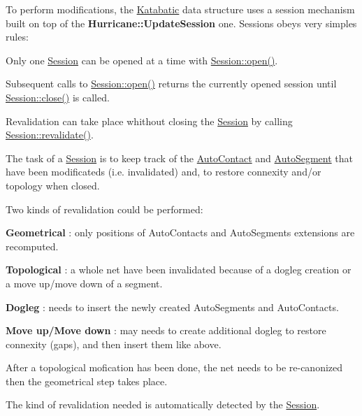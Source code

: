 To perform modifications, the \hyperlink{namespaceKatabatic}{Katabatic} data structure uses a session mechanism built on top of the {\bf Hurricane\-::\-Update\-Session} one. Sessions obeys very simples rules\-:
\begin{DoxyItemize}
\item Only one \hyperlink{classKatabatic_1_1Session}{Session} can be opened at a time with \hyperlink{classKatabatic_1_1Session_a000e098850f6cccff6b289a294149a41}{Session\-::open()}.
\item Subsequent calls to \hyperlink{classKatabatic_1_1Session_a000e098850f6cccff6b289a294149a41}{Session\-::open()} returns the currently opened session until \hyperlink{classKatabatic_1_1Session_a5ae591df94fc66ccb85cbb6565368bca}{Session\-::close()} is called.
\item Revalidation can take place whithout closing the \hyperlink{classKatabatic_1_1Session}{Session} by calling \hyperlink{classKatabatic_1_1Session_a4da9e28432c1fdb0c754717487d9cc83}{Session\-::revalidate()}.
\end{DoxyItemize}

The task of a \hyperlink{classKatabatic_1_1Session}{Session} is to keep track of the \hyperlink{classKatabatic_1_1AutoContact}{Auto\-Contact} and \hyperlink{classKatabatic_1_1AutoSegment}{Auto\-Segment} that have been modificateds (i.\-e. invalidated) and, to restore connexity and/or topology when closed.

Two kinds of revalidation could be performed\-: 
\begin{DoxyItemize}
\item {\bfseries Geometrical} \-: only positions of Auto\-Contacts and Auto\-Segments extensions are recomputed. 
\item {\bfseries Topological} \-: a whole net have been invalidated because of a dogleg creation or a move up/move down of a segment. 
\begin{DoxyItemize}
\item {\bfseries Dogleg} \-: needs to insert the newly created Auto\-Segments and Auto\-Contacts. 
\item {\bfseries Move up/\-Move down} \-: may needs to create additional dogleg to restore connexity (gaps), and then insert them like above. 
\end{DoxyItemize}After a topological mofication has been done, the net needs to be re-\/canonized then the geometrical step takes place. 
\end{DoxyItemize}

The kind of revalidation needed is automatically detected by the \hyperlink{classKatabatic_1_1Session}{Session}.

